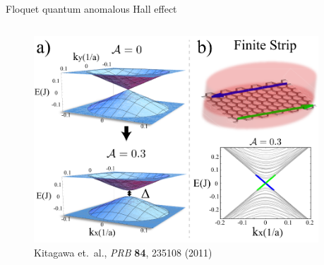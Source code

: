 \documentclass[xcolor=dvipsnames,10pt,aspectratio=169]{beamer}
\begin{document}
  \begin{frame}{Floquet quantum anomalous Hall effect}
    \begin{columns}
      \centering
      \begin{figure}
        \includegraphics[width=0.95\textwidth]{./figures/kitagawa-theory.png}
        \caption*{\footnotesize Kitagawa et.\ al., \textit{PRB} \textbf{84}, 235108 (2011)}
      \end{figure}


\end{columns}
\end{frame}
\end{document}
